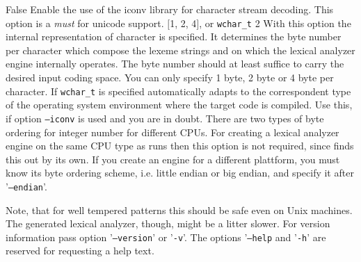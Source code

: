 \begin{description}
     {} {False}
        {
	    Enable the use of the iconv library for character stream decoding. This option
            is a {\it must} for unicode support.
	}
     {$[$1, 2, 4$]$, or {\tt wchar\_t}} {2}
        {
	    With this option the internal representation of character is specified. It 
            determines the byte number per character which compose the lexeme strings
	    and on which the lexical analyzer engine internally operates. The byte number
	    should at least suffice to carry the desired input coding space. You can
	    only specify 1 byte, 2 byte or 4 byte per character. If {\tt wchar\_t} is specified
	    {\quex} automatically adapts to the correspondent type of the  operating
	    system environment where the target code is compiled. 
	    Use this, if option {\tt --iconv} is used and you are in doubt.
	}
        {
	    There are two types of byte ordering for integer number for different CPUs.
	    For creating a lexical analyzer engine on the same CPU type as {\quex} runs
	    then this option is not required, since {\quex} finds this out by its own.
	    If you create an engine for a different plattform, you must know its byte ordering
	    scheme, i.e. little endian or big endian, and specify it after '{\tt --endian}'.
	}
\end{description}


Note, that for well tempered patterns this should be safe even on Unix
machines. The generated lexical analyzer, though, might be a litter slower.
For version information pass option '{\tt --version}' or '{\tt -v}'. The
options '{\tt --help} and '{\tt -h}' are reserved for requesting a help text.

